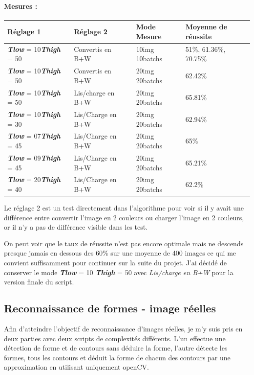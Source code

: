 	\paragraph{Mesures : }
	\begin{center}
		\begin{tabular}{l l | l l}
			Réglage 1 & Réglage 2 & Mode Mesure & Moyenne de réussite \\
			\hline
			\textit{\textbf{Tlow}} = 10\quad\textit{\textbf{Thigh}} = 50 &  Convertis en B+W & 10img 10batchs & 51\%, 61.36\%, 70.75\% \\
			\textit{\textbf{Tlow}} = 10\quad\textit{\textbf{Thigh}} = 50 &  Convertis en B+W & 20img 20batchs & 62.42\% \\
			\textit{\textbf{Tlow}} = 10\quad\textit{\textbf{Thigh}} = 50 & Lis/charge en B+W & 20img 20batchs & 65.81\% \\
			\textit{\textbf{Tlow}} = 10\quad\textit{\textbf{Thigh}} = 30 & Lis/Charge en B+W & 20img 20batchs & 62.94\% \\
			\textit{\textbf{Tlow}} = 07\quad\textit{\textbf{Thigh}} = 45 & Lis/Charge en B+W & 20img 20batchs & 65\% \\
			\textit{\textbf{Tlow}} = 09\quad\textit{\textbf{Thigh}} = 45 & Lis/Charge en B+W & 20img 20batchs & 65.21\% \\
			\textit{\textbf{Tlow}} = 20\quad\textit{\textbf{Thigh}} = 40 & Lis/Charge en B+W & 20img 20batchs & 62.2\% \\
		\end{tabular}
	\end{center}
	
	Le réglage 2 est un test directement dans l'algorithme pour voir si il y avait une différence entre convertir l'image en 2 couleurs ou charger l'image en 2 couleurs, or il n'y a pas de différence visible dans les test.
	
	On peut voir que le taux de réussite n'est pas encore optimale mais ne descends presque jamais en dessous des 60\% sur une moyenne de 400 images ce qui me convient suffisamment pour continuer sur la suite du projet. J'ai décidé de conserver le mode \textit{\textbf{Tlow}} = 10 \textit{\textbf{Thigh}} = 50 avec \textit{Lis/charge en B+W} pour la version finale du script.

\subsection{Reconnaissance de formes - image réelles}
Afin d'atteindre l'objectif de reconnaissance d'images réelles, je m'y suis pris en deux parties avec deux scripts de complexités différents. L'un effectue une détection de forme et de contours sans déduire la forme, l'autre détecte les formes, tous les contours et déduit la forme de chacun des contours par une approximation en utilisant uniquement openCV.

